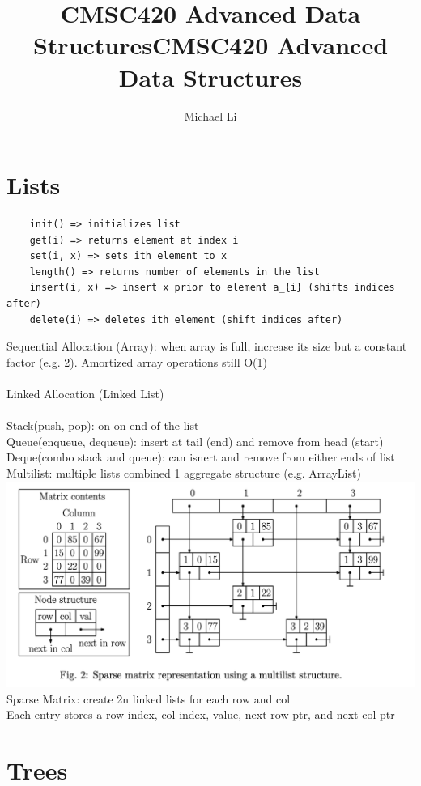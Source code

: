\documentclass{article}
\title{CMSC420 Advanced Data Structures}
\begin{document}
 
  \author{Michael Li}
  \title{CMSC420 Advanced Data Structures}
  \maketitle
  \tableofcontents
  \newpage
  \noindent \section{Lists}
  \begin{lstlisting}
    init() => initializes list
    get(i) => returns element at index i
    set(i, x) => sets ith element to x
    length() => returns number of elements in the list
    insert(i, x) => insert x prior to element a_{i} (shifts indices after)
    delete(i) => deletes ith element (shift indices after)
  \end{lstlisting}
  Sequential Allocation (Array): when array is full, increase  its size but a constant factor (e.g. 2). Amortized array operations still O(1) \\ \\
  Linked Allocation (Linked List) \\ \\
  Stack(push, pop): on on end of the list \\
  Queue(enqueue, dequeue): insert at tail (end) and remove from head (start) \\
  Deque(combo stack and queue): can isnert and remove from either ends of list\\
  Multilist: multiple lists combined 1 aggregate structure (e.g. ArrayList)\\
  \includegraphics[width=\textwidth]{Fig_2}
  Sparse Matrix: create 2n linked lists for each row and col \\
  \indent Each entry stores a row index, col index, value, next row ptr, and next col ptr
  \newpage
  \noindent\section{Trees}
\end{document}

